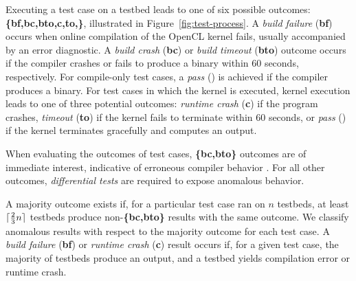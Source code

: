Executing a test case on a testbed leads to one of six possible outcomes: \textbf{\{bf,bc,bto,c,to,\cmark\}}, illustrated in Figure~\ref{fig:test-process}. A \emph{build failure} (\textbf{bf}) occurs when online compilation of the OpenCL kernel fails, usually accompanied by an error diagnostic. A \emph{build crash} (\textbf{bc}) or \emph{build timeout} (\textbf{bto}) outcome occurs if the compiler crashes or fails to produce a binary within 60 seconds, respectively. For compile-only test cases, a \emph{pass} (\textbf{\cmark}) is achieved if the compiler produces a binary. For test cases in which the kernel is executed, kernel execution leads to one of three potential outcomes: \emph{runtime crash} (\textbf{c}) if the program crashes, \emph{timeout} (\textbf{to}) if the kernel fails to terminate within 60 seconds, or \emph{pass} (\textbf{\cmark}) if the kernel terminates gracefully and computes an output.
%

When evaluating the outcomes of test cases, \textbf{\{bc,bto\}} outcomes are of immediate interest, indicative of erroneous compiler behavior . For all other outcomes, \emph{differential tests} are required to expose anomalous behavior.

A majority outcome exists if, for a particular test case ran on $n$ testbeds, at least $\lceil\frac{2}{3}n\rceil$ testbeds produce non-\textbf{\{bc,bto\}} results with the same outcome. We classify anomalous results with respect to the majority outcome for each test case. A \emph{build failure} (\textbf{bf}) or \emph{runtime crash} (\textbf{c}) result occurs if, for a given test case, the majority of testbeds produce an output, and a testbed yields compilation error or runtime crash.

